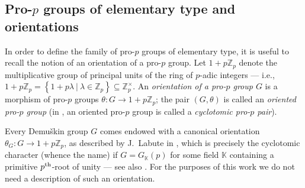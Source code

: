 \documentclass{amsart}
\theoremstyle{definition}
\theoremstyle{remark}
\newcommand{\KK}{\mathbb{K}}
\newcommand{\ZZ}{\mathbb{Z}}
\newcommand{\set}[2]{\left\lbrace{#1}\ \big\vert\ {#2}\right\rbrace}
\newcommand{\pth}{{p^{\rm th}}}
\begin{document}
\subsection{Pro-\texorpdfstring{$p$}{} groups of elementary type and orientations}
\label{ssec:Elementary Type groups}

In order to define the family of pro-$p$ groups of elementary type, it is useful to recall the notion of an {orientation of a pro-$p$ group}.
Let $1+p\ZZ_p$ denote the multiplicative group of principal units of the ring of $p$-adic integers --- i.e., $1+p\ZZ_p=\set{1+p\lambda}{\lambda\in\ZZ_p}\subseteq \ZZ_p^\times$.
An {\sl orientation of a pro-$p$ group $G$} is a morphism of pro-$p$ groups $\theta\colon G\to1+p\ZZ_p$; the pair $(G,\theta)$ is called an {\sl oriented pro-$p$ group} (in \cite{ETC2}, an oriented pro-$p$ group is called a {\sl cyclotomic pro-$p$ pair}).

Every Demu\v{s}kin group $G$ comes endowed with a canonical orientation $\theta_G\colon G\to1+p\ZZ_p$, as described by J.~Labute in \cite[\S~3]{labute:demushkin}, which is precisely the cyclotomic character (whence the name) if $G=G_{\KK}(p)$ for some field $\KK$ containing a primitive $\pth$-root of unity --- see also \cite[\S~5.3]{qw:cyc}.
For the purposes of this work we do not need a description of such an orientation. 
\end{document}

